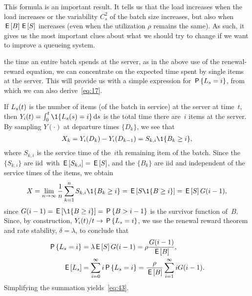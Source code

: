 \documentclass[stochastic-or.tex]{subfiles}
\begin{document}
This formula is an important result.
It tells us that the load increases when the load increases or the variability $C_{s}^{2}$ of the batch size increases, but also when $\,\mathsf{E}\left[B\right] \,\mathsf{E}\left[S\right]$ increases (even when the utilization $\rho$ remains the same). As such, it gives us the most important clues about  what we should try to change if we want to improve a queueing system.

 the time an entire batch spends at the server, as in the above use of the renewal-reward equation, we can
concentrate on the expected time spent by single items at the server.
This will provide us with a simple expression for $\,\mathsf{P}\left\{L_s=i\right\}$, from which we can also derive~\cref{eq:17}.

If $L_s(t)$ is the number of items (of the batch in service) at the server at time~$t$, then $Y_i(t) = \int_0^t \1{\Ls(s)=i} \d s$ is the total time there are~$i$ items at the server.
By sampling $Y(\cdot)$ at departure times $\{D_k\}$, we see that
\begin{align*}
X_k = Y_i(D_k) - Y_i(D_{k-1}) = S_{k,i} \1{B_{k} \geq i},
\end{align*}
where $S_{k,i}$ is the service time of the~$i$th remaining item of the batch.
Since the $\{S_{k, i}\}$ are iid\ with $\,\mathsf{E}\left[S_{k,i}\right] = \,\mathsf{E}\left[S\right]$, and the $\{B_k\}$ are iid and independent of the service times of the items, we obtain
 \begin{equation*}
X = \lim_{n\to\infty} \frac{1}{n}\sum_{k=1}^n S_{k,i} \1{B_{k} \geq i} = \E{S \1{B\geq i}} = \E S G(i-1),
 \end{equation*}
since $G(i-1) = \E{\1{B\geq i}} = \P{B> i-1}$ is the survivor function of~$B$.
Since, by construction, $Y_i(t)/t \to \,\mathsf{P}\left\{L_s=i\right\}$,   we use the renewal reward theorem and rate stability, $\delta = \lambda$, to conclude that
 \begin{align*}
 \,\mathsf{P}\left\{L_s = i\right\} &= \lambda \,\mathsf{E}\left[S\right] G(i-1) = \rho \frac{G(i-1)}{\,\mathsf{E}\left[B\right]}, \\
 \,\mathsf{E}\left[L_s\right] &= \sum_{i=0}^\infty i \,\mathsf{P}\left\{L_s=i\right\} = \frac{\rho}{\,\mathsf{E}\left[B\right]} \sum_{i=1}^\infty i G(i-1).
\end{align*}
Simplifying  the summation yields~\cref{eq:43}.
\end{document}
